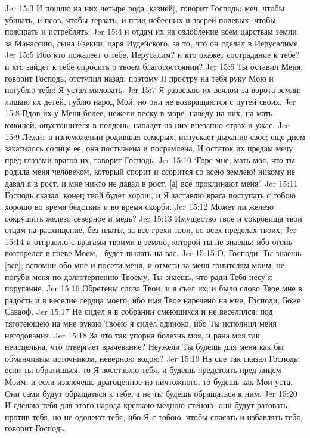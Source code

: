 Jer 15:3  И пошлю на них четыре рода [казней], говорит Господь: меч, чтобы убивать, и псов, чтобы терзать, и птиц небесных и зверей полевых, чтобы пожирать и истреблять;
Jer 15:4  и отдам их на озлобление всем царствам земли за Манассию, сына Езекии, царя Иудейского, за то, что он сделал в Иерусалиме.
Jer 15:5  Ибо кто пожалеет о тебе, Иерусалим? и кто окажет сострадание к тебе? и кто зайдет к тебе спросить о твоем благосостоянии?
Jer 15:6  Ты оставил Меня, говорит Господь, отступил назад; поэтому Я простру на тебя руку Мою и погублю тебя: Я устал миловать.
Jer 15:7  Я развеваю их веялом за ворота земли; лишаю их детей, гублю народ Мой; но они не возвращаются с путей своих.
Jer 15:8  Вдов их у Меня более, нежели песку в море; наведу на них, на мать юношей, опустошителя в полдень; нападет на них внезапно страх и ужас.
Jer 15:9  Лежит в изнеможении родившая семерых, испускает дыхание свое; еще днем закатилось солнце ее, она постыжена и посрамлена. И остаток их предам мечу пред глазами врагов их, говорит Господь.
Jer 15:10  `Горе мне, мать моя, что ты родила меня человеком, который спорит и ссорится со всею землею! никому не давал я в рост, и мне никто не давал в рост, [а] все проклинают меня'.
Jer 15:11  Господь сказал: конец твой будет хорош, и Я заставлю врага поступать с тобою хорошо во время бедствия и во время скорби.
Jer 15:12  Может ли железо сокрушить железо северное и медь?
Jer 15:13  Имущество твое и сокровища твои отдам на расхищение, без платы, за все грехи твои, во всех пределах твоих;
Jer 15:14  и отправлю с врагами твоими в землю, которой ты не знаешь; ибо огонь возгорелся в гневе Моем, --будет пылать на вас.
Jer 15:15  О, Господи! Ты знаешь [все]; вспомни обо мне и посети меня, и отмсти за меня гонителям моим; не погуби меня по долготерпению Твоему; Ты знаешь, что ради Тебя несу я поругание.
Jer 15:16  Обретены слова Твои, и я съел их; и было слово Твое мне в радость и в веселие сердца моего; ибо имя Твое наречено на мне, Господи, Боже Саваоф.
Jer 15:17  Не сидел я в собрании смеющихся и не веселился: под тяготеющею на мне рукою Твоею я сидел одиноко, ибо Ты исполнил меня негодования.
Jer 15:18  За что так упорна болезнь моя, и рана моя так неисцельна, что отвергает врачевание? Неужели Ты будешь для меня как бы обманчивым источником, неверною водою?
Jer 15:19  На сие так сказал Господь: если ты обратишься, то Я восставлю тебя, и будешь предстоять пред лицем Моим; и если извлечешь драгоценное из ничтожного, то будешь как Мои уста. Они сами будут обращаться к тебе, а не ты будешь обращаться к ним.
Jer 15:20  И сделаю тебя для этого народа крепкою медною стеною; они будут ратовать против тебя, но не одолеют тебя, ибо Я с тобою, чтобы спасать и избавлять тебя, говорит Господь.
